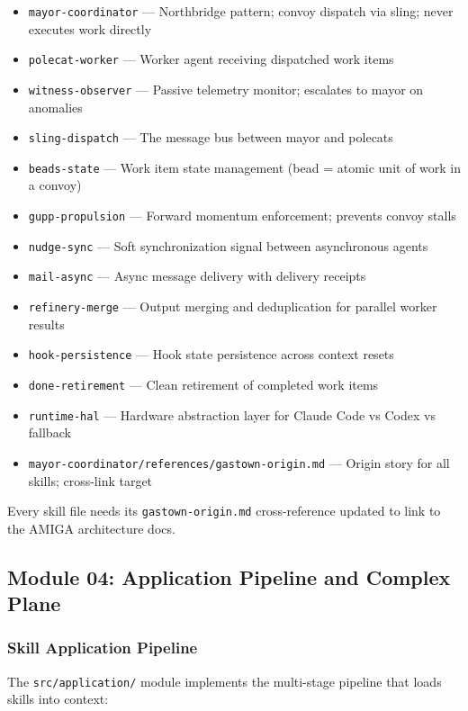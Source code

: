 \documentclass[11pt,letterpaper]{article}
\begin{document}
\begin{itemize}[noitemsep]
  \item \texttt{mayor-coordinator} --- Northbridge pattern; convoy dispatch via sling; never executes work directly
  \item \texttt{polecat-worker} --- Worker agent receiving dispatched work items
  \item \texttt{witness-observer} --- Passive telemetry monitor; escalates to mayor on anomalies
  \item \texttt{sling-dispatch} --- The message bus between mayor and polecats
  \item \texttt{beads-state} --- Work item state management (bead = atomic unit of work in a convoy)
  \item \texttt{gupp-propulsion} --- Forward momentum enforcement; prevents convoy stalls
  \item \texttt{nudge-sync} --- Soft synchronization signal between asynchronous agents
  \item \texttt{mail-async} --- Async message delivery with delivery receipts
  \item \texttt{refinery-merge} --- Output merging and deduplication for parallel worker results
  \item \texttt{hook-persistence} --- Hook state persistence across context resets
  \item \texttt{done-retirement} --- Clean retirement of completed work items
  \item \texttt{runtime-hal} --- Hardware abstraction layer for Claude Code vs Codex vs fallback
  \item \texttt{mayor-coordinator/references/gastown-origin.md} --- Origin story for all skills; cross-link target
\end{itemize}

Every skill file needs its \texttt{gastown-origin.md} cross-reference updated to link to the AMIGA architecture docs.

\subsection{Module 04: Application Pipeline and Complex Plane}

\subsubsection{Skill Application Pipeline}

The \texttt{src/application/} module implements the multi-stage pipeline that loads skills into context:
\end{document}
